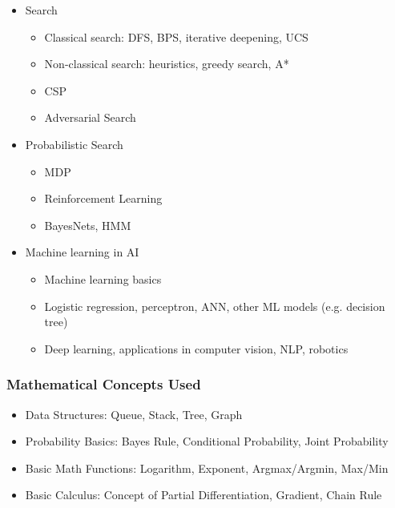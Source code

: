{\begin{highlight}[\CSPBAI]
        \begin{itemize}
            \item Search
            \begin{itemize}
                \item Classical search: DFS, BPS, iterative deepening, UCS
                \item Non-classical search: heuristics, greedy search, A*
                \item CSP
                \item Adversarial Search
            \end{itemize}
            \item Probabilistic Search
            \begin{itemize}
                \item MDP
                \item Reinforcement Learning
                \item BayesNets, HMM
            \end{itemize}
            \item Machine learning in AI
            \begin{itemize}
                \item Machine learning basics
                \item Logistic regression, perceptron, ANN, other ML models (e.g. decision tree)
                \item Deep learning, applications in computer vision, NLP, robotics
            \end{itemize}
        \end{itemize}
        
        \subsubsection*{Mathematical Concepts Used}
        
        \begin{itemize}
            \item Data Structures: Queue, Stack, Tree, Graph
            \item Probability Basics: Bayes Rule, Conditional Probability, Joint Probability
            \item Basic Math Functions: Logarithm, Exponent, Argmax/Argmin, Max/Min
            \item Basic Calculus: Concept of Partial Differentiation, Gradient, Chain Rule
        \end{itemize}
    \end{highlight}
}